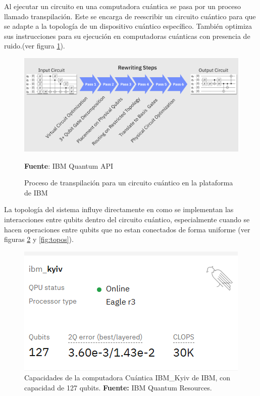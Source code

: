 \documentclass[letterpaper,12pt]{thesisECFM}
\theoremstyle{plain}
\theoremstyle{definition}
\theoremstyle{definition}
\theoremstyle{remark}
\newcommand{\1}{\mathbb{1}}
\begin{document}
Al ejecutar un circuito en una computadora cuántica se pasa por un proceso llamado transpilación. Este se encarga de reescribir un circuito cuántico para que se adapte a la topología de un dispositivo cuántico específico. También optimiza sus instrucciones para su ejecución en computadoras cuánticas con presencia de ruido.(ver figura \ref{fig:transpiling}). 
\begin{figure}[h]
    \centering
    \includegraphics[scale=0.20]{imagenes/transpiling_core_steps.png}
    \caption{Proceso de transpilación para un circuito cuántico en la plataforma de IBM} \textbf{Fuente}: IBM Quantum API \cite{qiskit_transpiler}
    \label{fig:transpiling}
\end{figure}
La topología del sistema influye directamente en como se implementan las interacciones entre qubits dentro del circuito cuántico, especialmente cuando se hacen operaciones entre qubits que no estan conectados de forma uniforme (ver figuras \ref{fig:topos_kyiv} y  \ref{fig:topos}). 

\begin{figure}[h]
    \centering
    \includegraphics[scale=0.7]{imagenes/ibm_kyiv_front.png}
    \caption{Capacidades de la computadora Cuántica IBM\_Kyiv de IBM, con capacidad de 127 qubits. \textbf{Fuente:} IBM Quantum Resources. \cite{ibm_quantum_resources}}
    \label{fig:topos_kyiv}
\end{figure}
\end{document}
